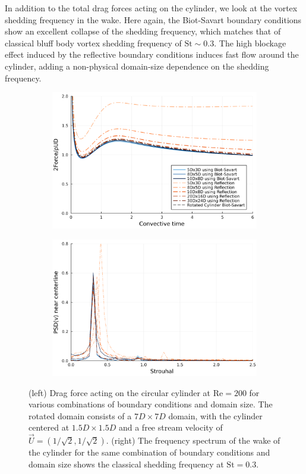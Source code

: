 \documentclass[final,1p,times]{elsarticle}
\begin{document}
In addition to the total drag forces acting on the cylinder, we look at the vortex shedding frequency in the wake. Here again, the Biot-Savart boundary conditions show an excellent collapse of the shedding frequency, which matches that of classical bluff body vortex shedding frequency of $\text{St}\sim 0.3$. The high blockage effect induced by the reflective boundary conditions induces fast flow around the cylinder, adding a non-physical domain-size dependence on the shedding frequency.

\begin{figure}
    \centering
    \begin{subfigure}{.5\textwidth}
        \centering
        \includegraphics[width=\textwidth]{tex//fig/force.png}
    \end{subfigure}%
    \begin{subfigure}{.5\textwidth}
        \centering
        \includegraphics[width=\textwidth]{tex/fig/fft.png}
    \end{subfigure}%
    \caption{(left) Drag force acting on the circular cylinder at $\text{Re}=200$ for various combinations of boundary conditions and domain size. The rotated domain consists of a $7D\times7D$ domain, with the cylinder centered at $1.5D\times1.5D$ and a free stream velocity of $\vec{U}=(1/\sqrt2,1/\sqrt2)$. (right) The frequency spectrum of the wake of the cylinder for the same combination of boundary conditions and domain size shows the classical shedding frequency at $\text{St}=0.3$.}
    \label{fig:cylinder_force}
\end{figure}
\end{document}
